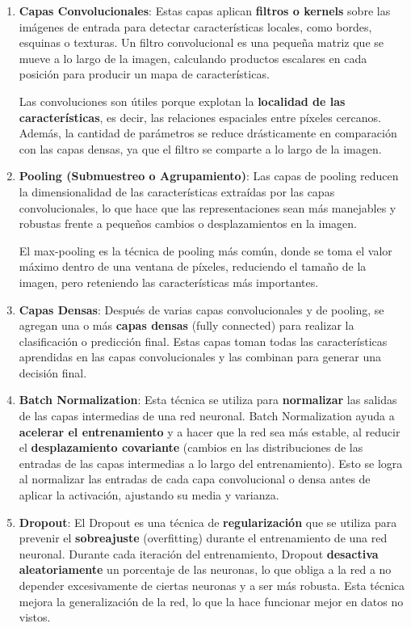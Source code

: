 \begin{enumerate}
    \item \textbf{Capas Convolucionales}: Estas capas aplican \textbf{filtros o kernels} sobre las imágenes de entrada
para detectar características locales, como bordes, esquinas o texturas.
Un filtro convolucional es una pequeña matriz que se mueve a lo largo de la imagen, calculando productos escalares en
cada posición para producir un mapa de características.

Las convoluciones son útiles porque explotan la \textbf{localidad de las características}, es decir, las relaciones
espaciales entre píxeles cercanos.
Además, la cantidad de parámetros se reduce drásticamente en comparación con las capas densas, ya que el filtro se
comparte a lo largo de la imagen.
    \item \textbf{Pooling (Submuestreo o Agrupamiento)}: Las capas de pooling reducen la dimensionalidad de las
características extraídas por las capas convolucionales, lo que hace que las representaciones sean más manejables y
robustas frente a pequeños cambios o desplazamientos en la imagen.

El max-pooling es la técnica de pooling más común, donde se toma el valor máximo dentro de una ventana de píxeles,
reduciendo el tamaño de la imagen, pero reteniendo las características más importantes.
    \item \textbf{Capas Densas}: Después de varias capas convolucionales y de pooling, se agregan una o más
\textbf{capas densas} (fully connected) para realizar la clasificación o predicción final.
Estas capas toman todas las características aprendidas en las capas convolucionales y las combinan para generar una
decisión final.
    \item \textbf{Batch Normalization}: Esta técnica se utiliza para \textbf{normalizar} las salidas de las capas
intermedias de una red neuronal.
Batch Normalization ayuda a \textbf{acelerar el entrenamiento} y a hacer que la red sea más estable, al reducir el
\textbf{desplazamiento covariante} (cambios en las distribuciones de las entradas de las capas intermedias a lo largo
del entrenamiento).
Esto se logra al normalizar las entradas de cada capa convolucional o densa antes de aplicar la activación, ajustando
su media y varianza.

    \item \textbf{Dropout}: El Dropout es una técnica de \textbf{regularización} que se utiliza para prevenir el
\textbf{sobreajuste} (overfitting) durante el entrenamiento de una red neuronal.
Durante cada iteración del entrenamiento, Dropout \textbf{desactiva aleatoriamente} un porcentaje de las neuronas, lo
que obliga a la red a no depender excesivamente de ciertas neuronas y a ser más robusta.
Esta técnica mejora la generalización de la red, lo que la hace funcionar mejor en datos no vistos.

\end{enumerate}

